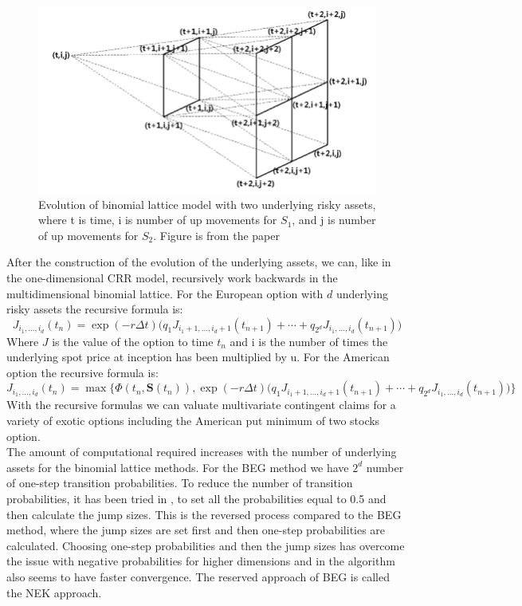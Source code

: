 \begin{figure}[th]
\centering
\includegraphics[width=\textwidth]{Figures/Three-dimensional-binomial-lattice.png}
\decoRule
\caption[Three-dimensional Binomial Lattice]{Evolution of binomial lattice model with two underlying risky assets, where t is time, i is number of up movements for $S_1$, and j is number of up movements for $S_2$. Figure is from the paper \parencite{KIM}}
\label{fig:threeDimLattice}
\end{figure}

After the construction of the evolution of the underlying assets, we can, like in the one-dimensional CRR model, recursively work backwards in the multidimensional binomial lattice. For the European option with $d$ underlying risky assets the recursive formula is:
$$J_{i_1,\ldots, i_d}(t_n)=\exp(-r\Delta t) \bigg(q_1 J_{i_1+1,\ldots, i_d +1}(t_{n+1}) + \cdots + q_{2^d} J_{i_1,\ldots, i_d}(t_{n+1}) \bigg)$$
Where $J$ is the value of the option to time $t_n$ and i is the number of times the underlying spot price at inception has been multiplied by u. For the American option the recursive formula is:
$$J_{i_1,\ldots, i_d}(t_n)=\max\{\Phi(t_n,\bm{S}(t_n)), \exp(-r\Delta t) \bigg(q_1 J_{i_1+1,\ldots, i_d +1}(t_{n+1}) + \cdots + q_{2^d} J_{i_1,\ldots, i_d}(t_{n+1}) \bigg)\}$$
With the recursive formulas we can valuate multivariate contingent claims for a variety of exotic options including the American put minimum of two stocks option. \\

The amount of computational required increases with the number of underlying assets for the binomial lattice methods. For the BEG method we have $2^d$ number of one-step transition probabilities. To reduce the number of transition probabilities, it has been tried in \parencite{NEK}, to set all the probabilities equal to 0.5 and then calculate the jump sizes. This is the reversed process compared to the BEG method, where the jump sizes are set first and then one-step probabilities are calculated. Choosing one-step probabilities and then the jump sizes has overcome the issue with negative probabilities for higher dimensions and in \parencite{NEK} the algorithm also seems to have faster convergence. The reserved approach of BEG is called the NEK approach.\\

